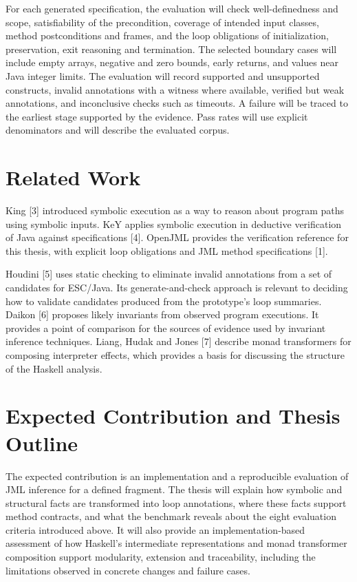 \documentclass[11pt,a4paper]{article}
\begin{document}
For each generated specification, the evaluation will check well-definedness and scope, satisfiability of the precondition, coverage of intended input classes, method postconditions and frames, and the loop obligations of initialization, preservation, exit reasoning and termination. The selected boundary cases will include empty arrays, negative and zero bounds, early returns, and values near Java integer limits. The evaluation will record supported and unsupported constructs, invalid annotations with a witness where available, verified but weak annotations, and inconclusive checks such as timeouts. A failure will be traced to the earliest stage supported by the evidence. Pass rates will use explicit denominators and will describe the evaluated corpus.

\section{Related Work}
King [3] introduced symbolic execution as a way to reason about program paths using symbolic inputs. KeY applies symbolic execution in deductive verification of Java against specifications [4]. OpenJML provides the verification reference for this thesis, with explicit loop obligations and JML method specifications [1].

Houdini [5] uses static checking to eliminate invalid annotations from a set of candidates for ESC/Java. Its generate-and-check approach is relevant to deciding how to validate candidates produced from the prototype's loop summaries. Daikon [6] proposes likely invariants from observed program executions. It provides a point of comparison for the sources of evidence used by invariant inference techniques. Liang, Hudak and Jones [7] describe monad transformers for composing interpreter effects, which provides a basis for discussing the structure of the Haskell analysis.

\section{Expected Contribution and Thesis Outline}
The expected contribution is an implementation and a reproducible evaluation of JML inference for a defined fragment. The thesis will explain how symbolic and structural facts are transformed into loop annotations, where these facts support method contracts, and what the benchmark reveals about the eight evaluation criteria introduced above. It will also provide an implementation-based assessment of how Haskell's intermediate representations and monad transformer composition support modularity, extension and traceability, including the limitations observed in concrete changes and failure cases.
\end{document}
